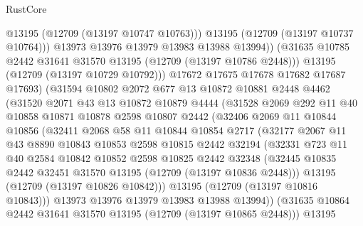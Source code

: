 \begin{lexlean}{RustCore}
\begin{coremodule}
                      @13195
                      (@12709 (@13197 @10747 @10763)))
                    @13195
                    (@12709 (@13197 @10737 @10764)))
                  @13973
                  @13976
                  @13979
                  @13983
                  @13988
                  @13994))
              (@31635 @10785 @2442 @31641 @31570 @13195 (@12709 (@13197 @10786 @2448)))
              @13195
              (@12709 (@13197 @10729 @10792)))
            @17672
            @17675
            @17678
            @17682
            @17687
            @17693)
          (@31594
            @10802
            @2072
            @677
            @13
            @10872
            @10881
            @2448
            @4462
            (@31520
              @2071
              @43
              @13
              @10872
              @10879
              @4444
              (@31528
                @2069
                @292
                @11
                @40
                @10858
                @10871
                @10878
                @2598
                @10807
                @2442
                (@32406
                  @2069
                  @11
                  @10844
                  @10856
                  (@32411
                    @2068
                    @58
                    @11
                    @10844
                    @10854
                    @2717
                    (@32177
                      @2067
                      @11
                      @43
                      @8890
                      @10843
                      @10853
                      @2598
                      @10815
                      @2442
                      @32194
                      (@32331
                        @723
                        @11
                        @40
                        @2584
                        @10842
                        @10852
                        @2598
                        @10825
                        @2442
                        @32348
                        (@32445 @10835 @2442 @32451 @31570 @13195 (@12709 (@13197 @10836 @2448)))
                        @13195
                        (@12709 (@13197 @10826 @10842)))
                      @13195
                      (@12709 (@13197 @10816 @10843)))
                    @13973
                    @13976
                    @13979
                    @13983
                    @13988
                    @13994))
                (@31635 @10864 @2442 @31641 @31570 @13195 (@12709 (@13197 @10865 @2448)))
                @13195

\end{coremodule}
\end{lexlean}
